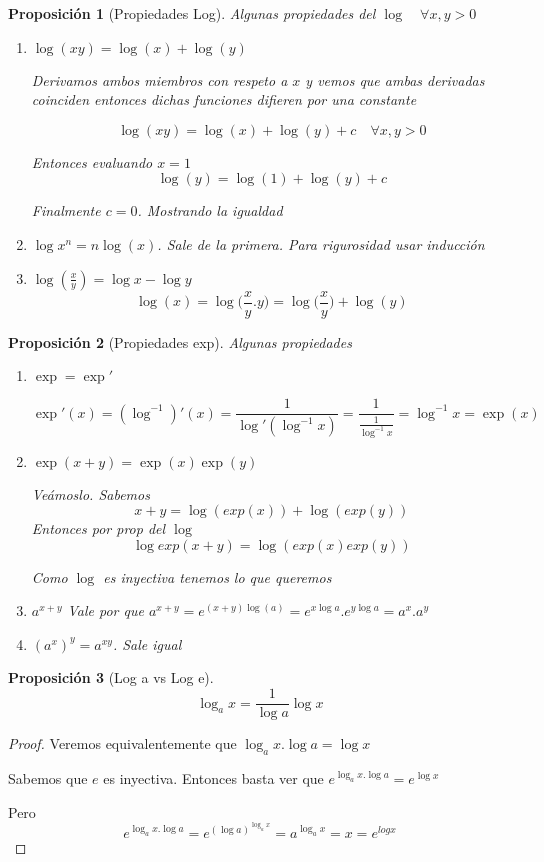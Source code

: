 \documentclass{article}
\theoremstyle{break}
\newtheorem{proposition}{Proposición}
\begin{document}
\begin{proposition}[Propiedades Log]
	Algunas propiedades del $\log \quad \forall x,y > 0$
\begin{enumerate}
	\item $\log(xy) = \log(x) + \log(y)$
	
	Derivamos ambos miembros con respeto a $x$ y vemos que ambas derivadas coinciden entonces dichas funciones difieren por
	una constante

	\[ \log(xy) = \log(x)+\log(y) + c \quad \forall x,y > 0\]
	
	Entonces evaluando $x=1$ \[ \log(y)=\log(1)+\log(y) + c \]

	Finalmente $c=0$. Mostrando la igualdad
	\item $\log{x^n}=n\log(x)$. Sale de la primera. Para rigurosidad usar inducción
	\item $\log{(\frac{x}{y})}=\log{x}-\log{y}$
	\[ \log(x) = \log\bigg(\frac{x}{y}.y\bigg) = \log\bigg(\frac{x}{y}\bigg) + \log(y)  \]
\end{enumerate}
\end{proposition}

\begin{proposition}[Propiedades exp]
	Algunas propiedades
\begin{enumerate}
	\item $\exp = \exp'$
	
	\[\exp'(x) = (\log^{-1})'(x) = \frac{1}{\log ' (\log^{-1}x)} = \frac{1}{\frac{1}{\log^{-1}x}}=\log^{-1}x = \exp(x)\]
	\item $\exp(x+y) = \exp(x)\exp(y)$ 
	
	Veámoslo. Sabemos \[x+y = \log (exp (x)) + \log(exp (y))\] 
	Entonces por prop del $\log$ \[\log exp(x+y) = \log (exp (x) exp (y))\]

	Como $\log$ es inyectiva tenemos lo que queremos
	\item $a^{x+y}$ Vale por que $a^{x+y}= e^{(x+y)\log(a)} =e^{x\log a}.e^{y\log a} = a^{x}.a^{y} $
	\item ${(a^x)}^y = a^{xy}$. Sale igual
\end{enumerate}
\end{proposition}

\begin{proposition}[Log a vs Log e]
	\[ \log_a x = \frac{1}{\log a}\log x \]
\end{proposition}
\begin{proof}
	Veremos equivalentemente que $\log_a x.\log a = \log x $ 
	
	Sabemos que $e$ es inyectiva. Entonces basta ver que $e^{\log_a x.\log a } = e^{\log x}$

	Pero \[e^{\log_a x.\log a} = e^{(\log a)^{\log_a x}} = a^{\log_a x} = x = e^{log x} \]
\end{proof}
\end{document}

